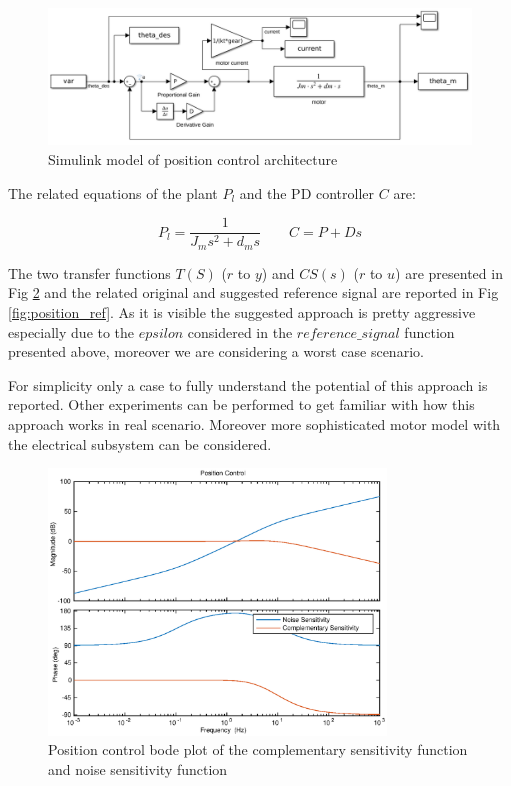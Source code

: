 \documentclass[a4paper,11pt]{article}
\begin{document}
\begin{figure}[H]
\begin{center}
\includegraphics[width=1\textwidth]{images/position.png}
\end{center}
\caption{Simulink model of position control architecture}
\label{fig:position_control}
\end{figure}

\bigskip
\noindent The related equations of the plant $P_l$ and the PD controller $C$ are:

\[
P_l = \frac{1}{J_m s^2 + d_m s} \qquad
C = P + Ds
\]

\bigskip
\noindent The two transfer functions $T(S)$ ($r$ to $y$) and $CS(s)$ ($r$ to $u$) are presented in Fig \ref{fig:position_tf} and the related original and suggested reference signal are reported in Fig \ref{fig:position_ref}. As it is visible the suggested approach is pretty aggressive especially due to the $epsilon$ considered in the $reference\_signal$ function presented above, moreover we are considering a worst case scenario.

\noindent For simplicity only a case to fully understand the potential of this approach is reported. Other experiments can be performed to get familiar with how this approach works in real scenario. Moreover more sophisticated motor model with the electrical subsystem can be considered.

\begin{figure}[H]
\begin{center}
\includegraphics[width=0.8\textwidth]{images/position_tf.eps}
\end{center}
\caption{Position control bode plot of the complementary sensitivity function and noise sensitivity function}
\label{fig:position_tf}
\end{figure}
\end{document}
